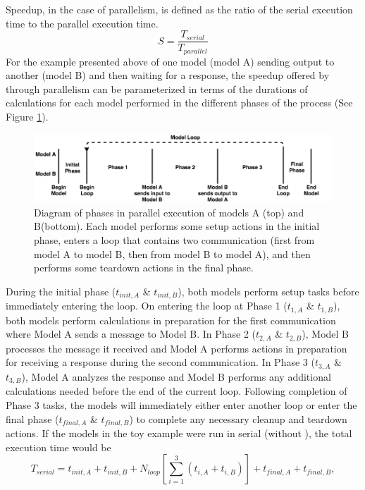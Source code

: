 \documentclass[journal]{IEEEtran}
\newcommand{\todo}[1]{{\color{red}{#1}}}
\newcommand{\pkg}{{\tt \todo{cis\_interface}}{}}
\begin{document}
Speedup, in the case of parallelism, is defined as the ratio of the serial execution time to the parallel execution time.
%
\begin{equation}
S = \frac{T_{serial}}{T_{parallel}}
\end{equation}
%
For the example presented above of one model (model A) sending output to another (model B) and then waiting for a response, the speedup offered by {\pkg} through parallelism can be parameterized in terms of the durations of calculations for each model performed in the different phases of the process (See Figure \ref{fig:empty_parallel}). 
%
\ifinclfig
 	\begin{figure}[htbp]
	\begin{center}
	\includegraphics[width=\columnwidth,keepaspectratio]{./images/Parallelism-Empty.png}
	\caption{Diagram of phases in parallel execution of models A (top) and B(bottom). Each model performs some setup actions in the initial phase, enters a loop that contains two communication (first from model A to model B, then from model B to model A), and then performs some teardown actions in the final phase.}
	\label{fig:empty_parallel}
	\end{center}
	\end{figure}
\fi
%
During the initial phase ($t_{init,A}$ \& $t_{init,B}$), both models perform setup tasks before immediately entering the loop. On entering the loop at Phase 1 ($t_{1,A}$ \& $t_{1,B}$), both models perform calculations in preparation for the first communication where Model A sends a message to Model B. In Phase 2 ($t_{2,A}$ \& $t_{2,B}$), Model B processes the message it received and Model A performs actions in preparation for receiving a response during the second communication. In Phase 3 ($t_{3,A}$ \& $t_{3,B}$), Model A analyzes the response and Model B performs any additional calculations needed before the end of the current loop. Following completion of Phase 3 tasks, the models will immediately either enter another loop or enter the final phase ($t_{final,A}$ \& $t_{final,B}$) to complete any necessary cleanup and teardown actions. 
%
If the models in the toy example were run in serial (without {\pkg}), the total execution time would be 
%
\begin{equation}
T_{serial} = t_{init,A} + t_{init,B} + N_{loop}\left[\sum_{i=1}^{3}\left(t_{i,A} + t_{i,B}\right)\right] + t_{final, A} + t_{final, B},
\end{equation}
\end{document}
